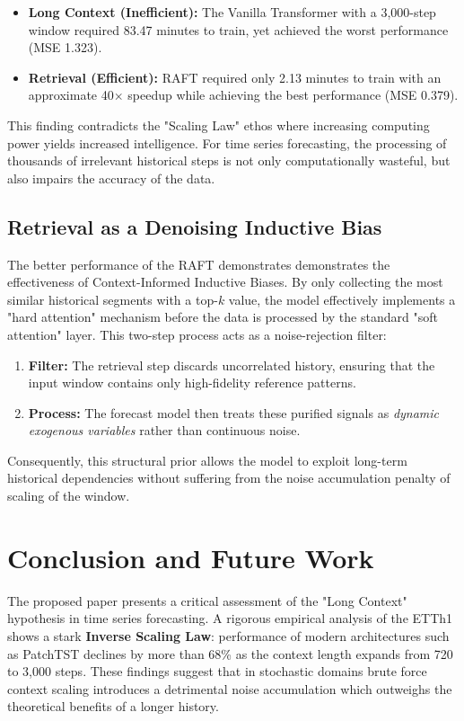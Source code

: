 \documentclass{article} %
\begin{document}
\begin{itemize}
    \item \textbf{Long Context (Inefficient):} The Vanilla Transformer with a 3,000-step window required 83.47 minutes to train, yet achieved the worst performance (MSE 1.323).
    \item \textbf{Retrieval (Efficient):} RAFT required only 2.13 minutes to train with an approximate 40$\times$ speedup while achieving the best performance (MSE 0.379).
\end{itemize}

This finding contradicts the "Scaling Law" ethos where increasing computing power yields increased intelligence. For time series forecasting, the processing of thousands of irrelevant historical steps is not only computationally wasteful, but also impairs the accuracy of the data.

\subsection{Retrieval as a Denoising Inductive Bias}
The better performance of the RAFT demonstrates demonstrates the effectiveness of Context-Informed Inductive Biases. By only collecting the most similar historical segments with a top-$k$ value, the model effectively implements a "hard attention" mechanism before the data is processed by the standard "soft attention" layer. This two-step process acts as a noise-rejection filter:
\begin{enumerate}
    \item \textbf{Filter:} The retrieval step discards uncorrelated history, ensuring that the input window contains only high-fidelity reference patterns.
    \item \textbf{Process:} The forecast model then treats these purified signals as \textit{dynamic exogenous variables} \citep{arango2025chronosx} rather than continuous noise.
\end{enumerate}
Consequently, this structural prior allows the model to exploit long-term historical dependencies without suffering from the noise accumulation penalty of scaling of the window.

\section{Conclusion and Future Work}

The proposed paper presents a critical assessment of the "Long Context" hypothesis in time series forecasting. A rigorous empirical analysis of the ETTh1 shows a stark \textbf{Inverse Scaling Law}: performance of modern architectures such as PatchTST declines by more than 68\% as the context length expands from 720 to 3,000 steps. These findings suggest that in stochastic domains brute force context scaling introduces a detrimental noise accumulation which outweighs the theoretical benefits of a longer history.
\end{document}

